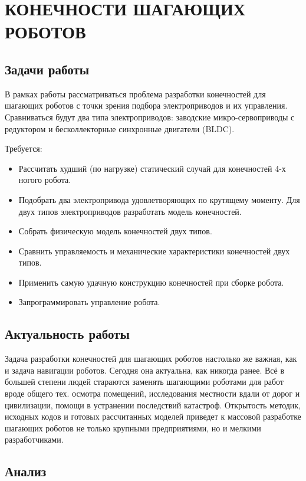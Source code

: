 \chapter{\MakeUppercase{Конечности шагающих роботов}}

\section{Задачи работы}

В рамках работы рассматриваться проблема разработки конечностей для шагающих роботов с точки зрения подбора электроприводов и их управления. Сравниваться будут два типа электроприводов: заводские микро-сервоприводы с редуктором и бесколлекторные синхронные двигатели (BLDC). 

Требуется:
\begin{itemize}
    \item Рассчитать худший (по нагрузке) статический случай для конечностей 4-х ногого робота.
    \item Подобрать два электропривода удовлетворяющих по крутящему моменту. Для двух типов электроприводов разработать модель конечностей.
    \item Собрать физическую модель конечностей двух типов.
    \item Сравнить управляемость и механические характеристики конечностей двух типов.
    \item Применить самую удачную конструкцию конечностей при сборке робота.
    \item Запрограммировать управление робота.
\end{itemize}

\section{Актуальность работы}

Задача разработки конечностей для шагающих роботов настолько же важная, как и задача навигации роботов. Сегодня она актуальна, как никогда ранее. Всё в большей степени людей стараются заменять шагающими роботами для работ вроде общего тех. осмотра помещений, исследования местности вдали от дорог и цивилизации, помощи в устранении последствий катастроф. Открытость методик, исходных кодов и готовых рассчитанных моделей приведет к массовой разработке шагающих роботов не только крупными предприятиями, но и мелкими разработчиками.

\section{Анализ}

